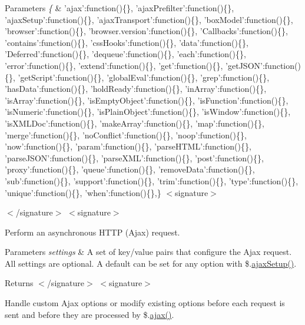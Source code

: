 \begin{DoxyParams}{Parameters}
{\em \{} & 'ajax'\-:function()\{\}, 'ajax\-Prefilter'\-:function()\{\}, 'ajax\-Setup'\-:function()\{\}, 'ajax\-Transport'\-:function()\{\}, 'box\-Model'\-:function()\{\}, 'browser'\-:function()\{\}, 'browser.\-version'\-:function()\{\}, 'Callbacks'\-:function()\{\}, 'contains'\-:function()\{\}, 'css\-Hooks'\-:function()\{\}, 'data'\-:function()\{\}, 'Deferred'\-:function()\{\}, 'dequeue'\-:function()\{\}, 'each'\-:function()\{\}, 'error'\-:function()\{\}, 'extend'\-:function()\{\}, 'get'\-:function()\{\}, 'get\-J\-S\-O\-N'\-:function()\{\}, 'get\-Script'\-:function()\{\}, 'global\-Eval'\-:function()\{\}, 'grep'\-:function()\{\}, 'has\-Data'\-:function()\{\}, 'hold\-Ready'\-:function()\{\}, 'in\-Array'\-:function()\{\}, 'is\-Array'\-:function()\{\}, 'is\-Empty\-Object'\-:function()\{\}, 'is\-Function'\-:function()\{\}, 'is\-Numeric'\-:function()\{\}, 'is\-Plain\-Object'\-:function()\{\}, 'is\-Window'\-:function()\{\}, 'is\-X\-M\-L\-Doc'\-:function()\{\}, 'make\-Array'\-:function()\{\}, 'map'\-:function()\{\}, 'merge'\-:function()\{\}, 'no\-Conflict'\-:function()\{\}, 'noop'\-:function()\{\}, 'now'\-:function()\{\}, 'param'\-:function()\{\}, 'parse\-H\-T\-M\-L'\-:function()\{\}, 'parse\-J\-S\-O\-N'\-:function()\{\}, 'parse\-X\-M\-L'\-:function()\{\}, 'post'\-:function()\{\}, 'proxy'\-:function()\{\}, 'queue'\-:function()\{\}, 'remove\-Data'\-:function()\{\}, 'sub'\-:function()\{\}, 'support'\-:function()\{\}, 'trim'\-:function()\{\}, 'type'\-:function()\{\}, 'unique'\-:function()\{\}, 'when'\-:function()\{\},\} $<$signature$>$ 
 $<$/signature$>$ $<$signature$>$ \\
\hline
\end{DoxyParams}
Perform an asynchronous H\-T\-T\-P (Ajax) request.


\begin{DoxyParams}{Parameters}
{\em settings} & A set of key/value pairs that configure the Ajax request. All settings are optional. A default can be set for any option with \$.\hyperlink{jquery-1_810_82-vsdoc_8js_a3b12f4f2a83dfdae4e81bcaeaf2a2f42}{ajax\-Setup()}.\\
\hline
\end{DoxyParams}
\begin{DoxyReturn}{Returns}
$<$/signature$>$ $<$signature$>$ 

Handle custom Ajax options or modify existing options before each request is sent and before they are processed by \$.\hyperlink{jquery-1_810_82-vsdoc_8js_a3c9e2ac71a76356869090140308936dc}{ajax()}.
\end{DoxyReturn}

